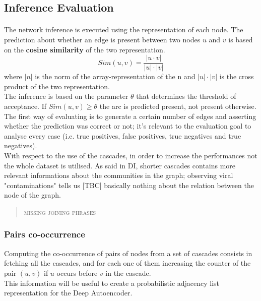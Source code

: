 \documentclass{article}
\begin{document}
		\subsection{Inference Evaluation}
			\paragraph{}
			The network inference is executed using the representation of each node. The prediction about whether an edge is present between two nodes $u$ and $v$ is based on the \textbf{cosine similarity} of the two representation.
			$$ Sim(u,v) = \frac{|u\cdot v|}{|u|\cdot |v|} $$
			where $|n|$ is the norm of the array-representation of the n and $|u|\cdot |v|$ is the cross product of the two representation.\\
			The inference is based on the parameter $\theta$ that determines the threshold of acceptance. If $Sim(u,v) \ge \theta$ the arc is predicted present, not present otherwise.\\
			The first way of evaluating is to generate a certain number of edges and asserting whether the prediction was correct or not; it's relevant to the evaluation goal to analyse every case (i.e. true positives, false positives, true negatives and true negatives).\medskip\\

			With respect to the use of the cascades, in order to increase the performances not the whole dataset is utilised. As said in DI, shorter cascades contains more relevant informations about the communities in the graph; observing viral "contaminations" tells us [TBC] basically nothing about the relation between the node of the graph. \\
			\begin{quote}
				\centering
				\textsc{missing joining phrases}\\
			\end{quote}
			\subsubsection{Pairs co-occurrence}
			Computing the co-occurrence of pairs of nodes from a set of cascades consists in fetching all the cascades, and for each one of them increasing the counter of the pair $(u,v)$ if $u$ occurs before $v$ in the cascade.\\
			This information will be useful to create a probabilistic adjacency list representation for the Deep Autoencoder.
\end{document}
